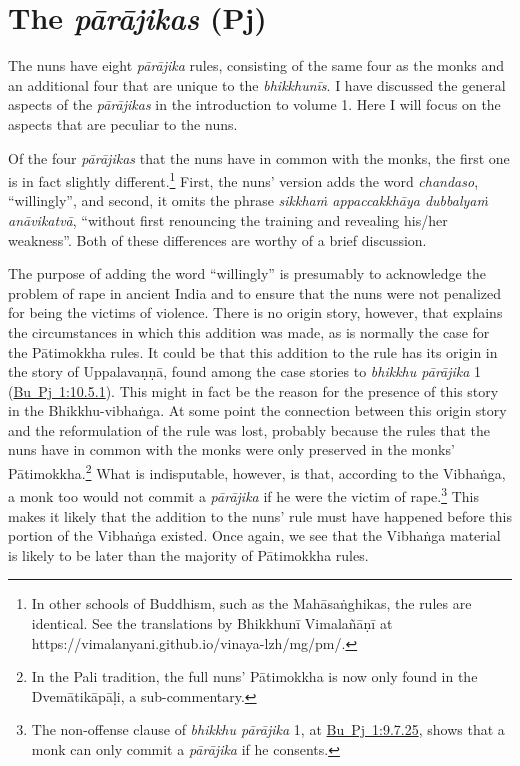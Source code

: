 \documentclass[12pt,openany]{book}%
\begin{document}
\section*{The \textit{\textsanskrit{pārājikas}} (Pj)}

The nuns have eight \textit{\textsanskrit{pārājika}} rules, consisting of the same four as the monks and an additional four that are unique to the \textit{\textsanskrit{bhikkhunīs}}. I have discussed the general aspects of the \textit{\textsanskrit{pārājikas}} in the introduction to volume 1. Here I will focus on the aspects that are peculiar to the nuns.

Of the four \textit{\textsanskrit{pārājikas}} that the nuns have in common with the monks, the first one is in fact slightly different.\footnote{In other schools of Buddhism, such as the \textsanskrit{Mahāsaṅghikas}, the rules are identical. See the translations by \textsanskrit{Bhikkhunī} \textsanskrit{Vimalañāṇī} at https://vimalanyani.github.io/vinaya-lzh/mg/pm/. } First, the nuns’ version adds the word \textit{chandaso}, “willingly”, and second, it omits the phrase \textit{\textsanskrit{sikkhaṁ} \textsanskrit{appaccakkhāya} \textsanskrit{dubbalyaṁ} \textsanskrit{anāvikatvā}}, “without first renouncing the training and revealing his/her weakness”. Both of these differences are worthy of a brief discussion.

The purpose of adding the word “willingly” is presumably to acknowledge the problem of rape in ancient India and to ensure that the nuns were not penalized for being the victims of violence. There is no origin story, however, that explains the circumstances in which this addition was made, as is normally the case for the \textsanskrit{Pātimokkha} rules. It could be that this addition to the rule has its origin in the story of \textsanskrit{Uppalavaṇṇā}, found among the case stories to \textit{bhikkhu \textsanskrit{pārājika}} 1 (\href{https://suttacentral.net/pli-tv-bu-vb-pj1/en/brahmali\#10.5.1}{Bu~Pj~1:10.5.1}). This might in fact be the reason for the presence of this story in the Bhikkhu-\textsanskrit{vibhaṅga}. At some point the connection between this origin story and the reformulation of the rule was lost, probably because the rules that the nuns have in common with the monks were only preserved in the monks’ \textsanskrit{Pātimokkha}.\footnote{In the Pali tradition, the full nuns’ \textsanskrit{Pātimokkha} is now only found in the \textsanskrit{Dvemātikāpāḷi}, a sub-commentary. } What is indisputable, however, is that, according to the \textsanskrit{Vibhaṅga}, a monk too would not commit a \textit{\textsanskrit{pārājika}} if he were the victim of rape.\footnote{The non-offense clause of \textit{bhikkhu \textsanskrit{pārājika}} 1, at \href{https://suttacentral.net/pli-tv-bu-vb-pj1/en/brahmali\#9.7.25}{Bu~Pj~1:9.7.25}, shows that a monk can only commit a \textit{\textsanskrit{pārājika}} if he consents. } This makes it likely that the addition to the nuns’ rule must have happened before this portion of the \textsanskrit{Vibhaṅga} existed. Once again, we see that the \textsanskrit{Vibhaṅga} material is likely to be later than the majority of \textsanskrit{Pātimokkha} rules.
\end{document}
